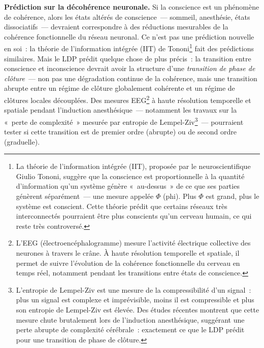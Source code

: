 \documentclass[12pt, a4paper, openright]{book}
\begin{document}
\textbf{Prédiction sur la décohérence neuronale.} Si la conscience est un phénomène de cohérence, alors les états altérés de conscience~--- sommeil, anesthésie, états dissociatifs~--- devraient correspondre à des réductions mesurables de la cohérence fonctionnelle du réseau neuronal. Ce n'est pas une prédiction nouvelle en soi~: la théorie de l'information intégrée (IIT) de Tononi\footnote{La théorie de l'information intégrée (IIT), proposée par le neuroscientifique Giulio Tononi, suggère que la conscience est proportionnelle à la quantité d'information qu'un système génère «~au-dessus~» de ce que ses parties génèrent séparément~--- une mesure appelée $\Phi$ (phi). Plus $\Phi$ est grand, plus le système est conscient. Cette théorie prédit que certains réseaux très interconnectés pourraient être plus conscients qu'un cerveau humain, ce qui reste très controversé.} fait des prédictions similaires. Mais le LDP prédit quelque chose de plus précis~: la transition entre conscience et inconscience devrait avoir la structure d'une \emph{transition de phase de clôture}~--- non pas une dégradation continue de la cohérence, mais une transition abrupte entre un régime de clôture globalement cohérente et un régime de clôtures locales découplées. Des mesures EEG\footnote{L'EEG (électroencéphalogramme) mesure l'activité électrique collective des neurones à travers le crâne. À haute résolution temporelle et spatiale, il permet de suivre l'évolution de la cohérence fonctionnelle du cerveau en temps réel, notamment pendant les transitions entre états de conscience.} à haute résolution temporelle et spatiale pendant l'induction anesthésique~--- notamment les travaux sur la «~perte de complexité~» mesurée par entropie de Lempel-Ziv\footnote{L'entropie de Lempel-Ziv est une mesure de la compressibilité d'un signal~: plus un signal est complexe et imprévisible, moins il est compressible et plus son entropie de Lempel-Ziv est élevée. Des études récentes montrent que cette mesure chute brutalement lors de l'induction anesthésique, suggérant une perte abrupte de complexité cérébrale~: exactement ce que le LDP prédit pour une transition de phase de clôture.}~--- pourraient tester si cette transition est de premier ordre (abrupte) ou de second ordre (graduelle).

\medskip
\end{document}

